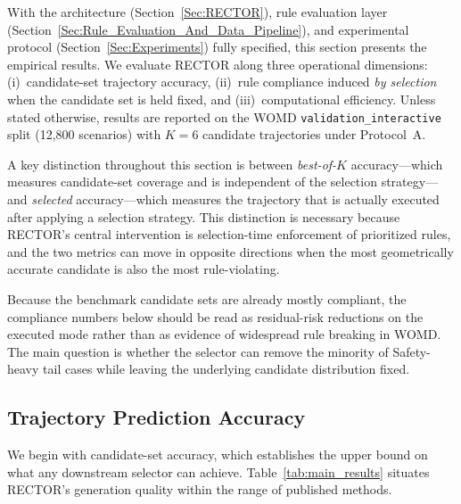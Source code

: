 With the architecture (Section~\ref{Sec:RECTOR}), rule evaluation layer (Section~\ref{Sec:Rule_Evaluation_And_Data_Pipeline}), and experimental protocol (Section~\ref{Sec:Experiments}) fully specified, this section presents the empirical results.  We evaluate RECTOR along three operational dimensions: (i)~candidate-set trajectory accuracy, (ii)~rule compliance induced \emph{by selection} when the candidate set is held fixed, and (iii)~computational efficiency.  Unless stated otherwise, results are reported on the WOMD \texttt{validation\_interactive} split (12{,}800 scenarios) with $K{=}6$ candidate trajectories under Protocol~A.

A key distinction throughout this section is between \emph{best-of-$K$} accuracy---which measures candidate-set coverage and is independent of the selection strategy---and \emph{selected} accuracy---which measures the trajectory that is actually executed after applying a selection strategy.  This distinction is necessary because RECTOR's central intervention is selection-time enforcement of prioritized rules, and the two metrics can move in opposite directions when the most geometrically accurate candidate is also the most rule-violating.

Because the benchmark candidate sets are already mostly compliant, the compliance numbers below should be read as residual-risk reductions on the executed mode rather than as evidence of widespread rule breaking in WOMD.  The main question is whether the selector can remove the minority of Safety-heavy tail cases while leaving the underlying candidate distribution fixed.

\subsection{Trajectory Prediction Accuracy}
\label{subsec:trajectory_accuracy}

We begin with candidate-set accuracy, which establishes the upper bound on what any downstream selector can achieve. Table~\ref{tab:main_results} situates RECTOR's generation quality within the range of published methods.

